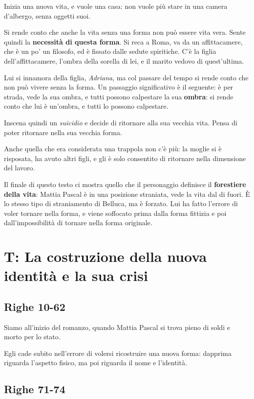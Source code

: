 Inizia una nuova vita, e vuole una casa: non vuole più stare in una camera d'albergo, senza oggetti suoi.

Si rende conto che anche la vita senza una forma non può essere vita vera. Sente quindi la \textbf{necessità di questa forma}.
Si reca a Roma, va da un affittacamere, che è un po' un filosofo, ed è fissato dalle sedute spiritiche.
C'è la figlia dell'affittacamere, l'ombra della sorella di lei, e il marito vedovo di quest'ultima.

Lui si innamora della figlia, \emph{Adriana}, ma col passare del tempo si rende conto che non può vivere senza la forma. Un passaggio significativo è il seguente: è per strada, vede la sua ombra, e tutti possono calpestare la sua \textbf{ombra}: si rende conto che lui è un'ombra, e tutti lo possono calpestare.

Inscena quindi un \emph{suicidio} e decide di ritornare alla sua vecchia vita. Pensa di poter ritornare nella sua vecchia forma.

Anche quella che era considerata una trappola non c'è più: la moglie si è risposata, ha avuto altri figli, e gli è solo consentito di ritornare nella dimensione del lavoro.


Il finale di questo testo ci mostra quello che il personaggio definisce il \textbf{forestiere della vita}: Mattia Pascal è in una posizione straniata, vede la vita dal di fuori. È lo stesso tipo di straniamento di Belluca, ma è forzato.
Lui ha fatto l'errore di voler tornare nella forma, e viene soffocato prima dalla forma fittizia e poi dall'impossibilità di tornare nella forma originale.

\section{T: La costruzione della nuova identità e la sua crisi}

\subsection{Righe 10-62}

Siamo all'inizio del romanzo, quando Mattia Pascal si trova pieno di soldi e morto per lo stato.

Egli cade subito nell'errore di volersi ricostruire una nuova forma: dapprima riguarda l'aspetto fisico, ma poi riguarda il nome e l'identità.

\subsection{Righe 71-74}

